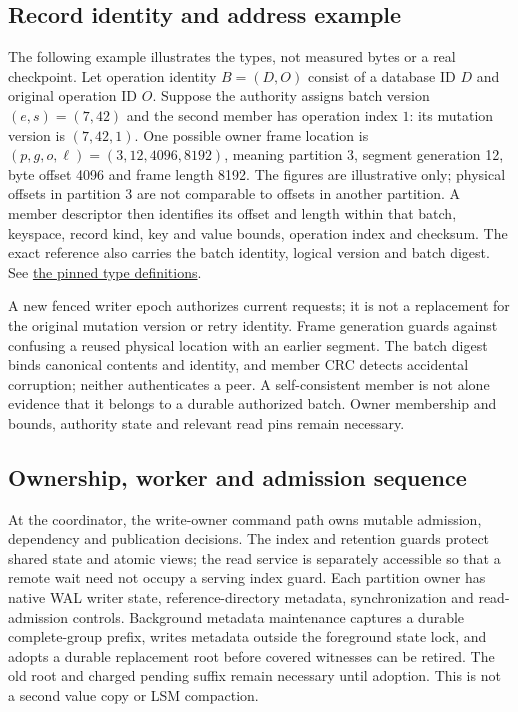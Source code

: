 \documentclass[11pt,a4paper]{article}
\begin{document}
\subsection{Record identity and address example}\label{sec:record-example}
The following example illustrates the types, not measured bytes or a real checkpoint. Let operation identity $B=(D,O)$ consist of a database ID $D$ and original operation ID $O$. Suppose the authority assigns batch version $(e,s)=(7,42)$ and the second member has operation index $1$: its mutation version is $(7,42,1)$. One possible owner frame location is $(p,g,o,\ell)=(3,12,4096,8192)$, meaning partition 3, segment generation 12, byte offset 4096 and frame length 8192. The figures are illustrative only; physical offsets in partition 3 are not comparable to offsets in another partition. A member descriptor then identifies its offset and length within that batch, keyspace, record kind, key and value bounds, operation index and checksum. The exact reference also carries the batch identity, logical version and batch digest. See \href{https://github.com/Loris-EPFL/tidehunter-distributed/blob/ba3a6a0194cca6f171e5916649e7f4eeba65aeb0/tidehunter/src/distributed/types.rs\#L8-L103}{the pinned type definitions}.

A new fenced writer epoch authorizes current requests; it is not a replacement for the original mutation version or retry identity. Frame generation guards against confusing a reused physical location with an earlier segment. The batch digest binds canonical contents and identity, and member CRC detects accidental corruption; neither authenticates a peer. A self-consistent member is not alone evidence that it belongs to a durable authorized batch. Owner membership and bounds, authority state and relevant read pins remain necessary.

\subsection{Ownership, worker and admission sequence}\label{sec:worker-flow}
At the coordinator, the write-owner command path owns mutable admission, dependency and publication decisions. The index and retention guards protect shared state and atomic views; the read service is separately accessible so that a remote wait need not occupy a serving index guard. Each partition owner has native WAL writer state, reference-directory metadata, synchronization and read-admission controls. Background metadata maintenance captures a durable complete-group prefix, writes metadata outside the foreground state lock, and adopts a durable replacement root before covered witnesses can be retired. The old root and charged pending suffix remain necessary until adoption. This is not a second value copy or LSM compaction.
\end{document}
